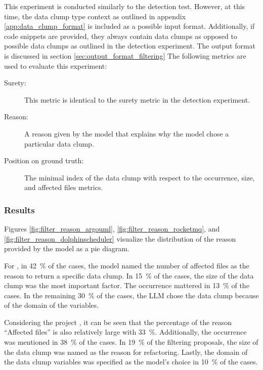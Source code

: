 This experiment is conducted similarly to the detection test. However, at this time, the data clump type context as outlined in appendix \ref{app:data_clump_format} is included as a possible input format. Additionally, if code snippets are provided, they always contain data clumps as opposed to possible data clumps as outlined in the detection experiment. 
The output format is discussed in section \ref{sec:output_format_filtering}
The following metrics are used to evaluate this experiment:
\begin{description}
    

    \item [Surety:] This metric is identical to the surety metric in the detection experiment. 
    \item [Reason:] A reason given by the model that explains why the model chose a particular data clump. 
    \item [Position on ground truth:] The minimal index of the data clump with respect to the occurrence, size, and affected files metrics.
\end{description}


\subsubsection{Results}

Figures \ref{fig:filter_reason_argouml}, \ref{fig:filter_reason_rocketmq}, and \ref{fig:filter_reason_dolphinscheduler} visualize the distribution of the reason provided by the model as a pie diagram.

For \argouml, in 42~\% of the cases, the model named the number of affected files as the reason to return a specific data clump. In 15~\% of the cases, the size of the data clump was the most important factor. The occurrence mattered in 13~\% of the cases. In the remaining 30~\% of the cases, the \ac{LLM} chose the data clump because of the domain of the variables. 

Considering the project \rocketmq, it can be seen that the percentage of the reason \enquote{Affected files} is also relatively large with 33~\%. Additionally, the occurrence was mentioned in 38~\% of the cases. In 19~\% of the filtering proposals, the size of the data clump was named as the reason for refactoring. Lastly, the domain of the data clump variables was specified as the model's choice in 10~\% of the cases.

